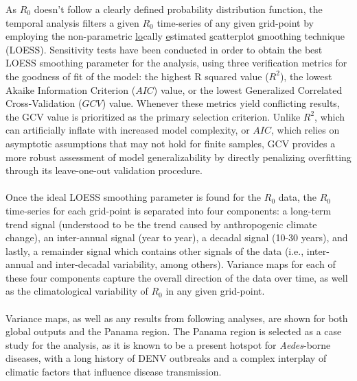 \documentclass[10pt,twocolumn]{wlscirep}
\begin{document}
As $R_0$ doesn't follow a clearly defined probability distribution function, the temporal analysis filters a given $R_0$ time-series of any given grid-point by employing the non-parametric \underline{lo}cally \underline{e}stimated \underline{s}catterplot \underline{s}moothing technique (LOESS)\cite{jacoby_2000}. Sensitivity tests have been conducted in order to obtain the best LOESS smoothing parameter for the analysis, using three verification metrics for the goodness of fit of the model: the highest R squared value\cite{healy_1984} ($R^2$), the lowest Akaike Information Criterion ($AIC$) value\cite{akaike_1998}, or the lowest Generalized Correlated Cross-Validation ($GCV$) value\cite{craven_1978}. Whenever these metrics yield conflicting results, the GCV value is prioritized as the primary selection criterion. Unlike $R^2$, which can artificially inflate with increased model complexity, or $AIC$, which relies on asymptotic assumptions that may not hold for finite samples, GCV provides a more robust assessment of model generalizability by directly penalizing overfitting through its leave-one-out validation procedure\cite{marcotte_1995}.
\\
\\
Once the ideal LOESS smoothing parameter is found for the $R_0$ data, the $R_0$ time-series for each grid-point is separated into four components: a long-term trend signal (understood to be the trend caused by anthropogenic climate change), an inter-annual signal (year to year), a decadal signal (10-30 years), and lastly, a remainder signal which contains other signals of the data (i.e., inter-annual and inter-decadal variability, among others). Variance maps for each of these four components capture the overall direction of the data over time, as well as the climatological variability of $R_0$ in any given grid-point.
\\
\\
Variance maps, as well as any results from following analyses, are shown for both global outputs and the Panama region. The Panama region is selected as a case study for the analysis, as it is known to be a present hotspot for \textit{Aedes}-borne diseases, with a long history of DENV outbreaks and a complex interplay of climatic factors that influence disease transmission\cite{miller_2015}.
\\
\\
\end{document}
